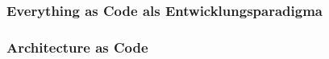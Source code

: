 \subsubsection{Everything as Code als Entwicklungsparadigma}
\label{sec:everything_as_code}

%
%
%
%
%


\subsubsection{Architecture as Code}
\label{sec:aac_foundation}

%
%
%
%
%
%
%
%
%


